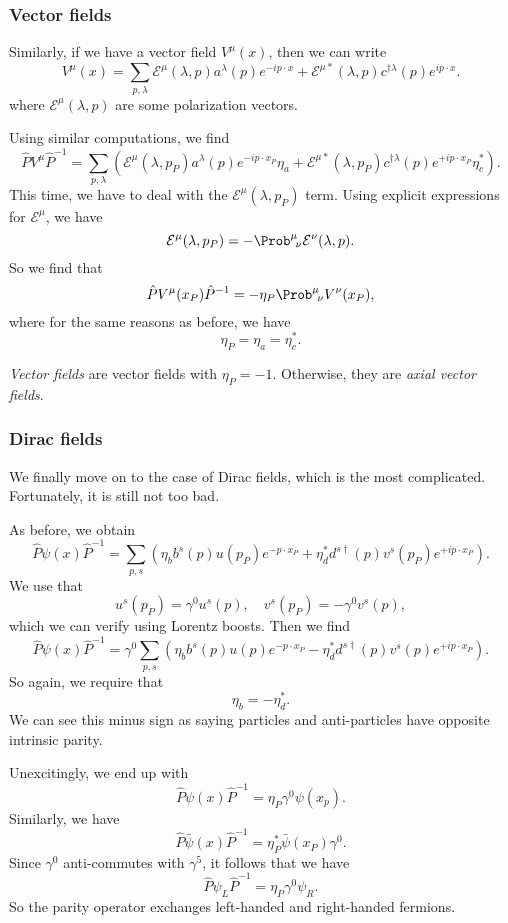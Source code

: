 \documentclass[a4paper]{article}
\begin{document}
\subsubsection*{Vector fields}
Similarly, if we have a vector field $V^\mu (x)$, then we can write
\[
  V^\mu(x) = \sum_{p, \lambda} \mathcal{E}^\mu(\lambda, p) a^\lambda(p) e^{-ip\cdot x} + \mathcal{E}^{\mu *} (\lambda, p) c^{\dagger \lambda} (p) e^{ip\cdot x}.
\]
where $\mathcal{E}^\mu(\lambda, p)$ are some polarization vectors.

Using similar computations, we find
\[
  \hat{P} V^\mu \hat{P}^{-1} = \sum_{p, \lambda} \left(\mathcal{E}^\mu (\lambda, p_P)a^\lambda(p) e^{-ip\cdot x_P} \eta_a + \mathcal{E}^{\mu*}(\lambda, p_P) c^{\dagger\lambda} (p) e^{+ip\cdot x_P} \eta_c^*\right).
\]
This time, we have to deal with the $\mathcal{E}^\mu(\lambda, p_P)$ term. Using explicit expressions for $\mathcal{E}^\mu$, we have
\[
  \mathcal{E}^\mu(\lambda, p_P) = - \Prob^\mu\!_\nu \mathcal{E}^\nu (\lambda, p).
\]
So we find that
\[
  \hat{P} V^\mu(x_P) \hat{P}^{-1} = - \eta_P \Prob^\mu\!_\nu V^\nu(x_P),
\]
where for the same reasons as before, we have
\[
  \eta_P = \eta_a = \eta_c^*.
\]
\begin{defi}
  \emph{Vector fields} are vector fields with $\eta_P = -1$. Otherwise, they are \emph{axial vector fields}.
\end{defi} %

\subsubsection*{Dirac fields}
We finally move on to the case of Dirac fields, which is the most complicated. Fortunately, it is still not too bad.

As before, we obtain
\[
  \hat{P}\psi(x) \hat{P}^{-1} = \sum_{p, s}\left( \eta_b b^s(p) u(p_P) e^{-p\cdot x_P} + \eta_d^* d^{s\dagger}(p) v^s(p_P) e^{+ip\cdot x_P}\right).
\]
We use that
\[
  u^s(p_P) = \gamma^0 u^s(p),\quad v^s(p_P) = - \gamma^0 v^s(p),
\]
which we can verify using Lorentz boosts. Then we find
\[
  \hat{P} \psi(x) \hat{P}^{-1} = \gamma^0 \sum_{p, s}\left( \eta_b b^s(p) u(p) e^{-p\cdot x_P} - \eta_d^* d^{s\dagger}(p) v^s(p) e^{+ip\cdot x_P}\right).
\]
So again, we require that
\[
  \eta_b = - \eta_d^*.
\]
We can see this minus sign as saying particles and anti-particles have opposite intrinsic parity.

Unexcitingly, we end up with
\[
  \hat{P} \psi(x) \hat{P}^{-1} = \eta_P \gamma^0 \psi(x_p).
\]
Similarly, we have
\[
  \hat{P} \bar\psi(x) \hat{P}^{-1} = \eta_P^* \bar\psi(x_P) \gamma^0.
\]
Since $\gamma^0$ anti-commutes with $\gamma^5$, it follows that we have
\[
  \hat{P} \psi_L \hat{P}^{-1} = \eta_P \gamma^0 \psi_R.
\]
So the parity operator exchanges left-handed and right-handed fermions.
\end{document}
